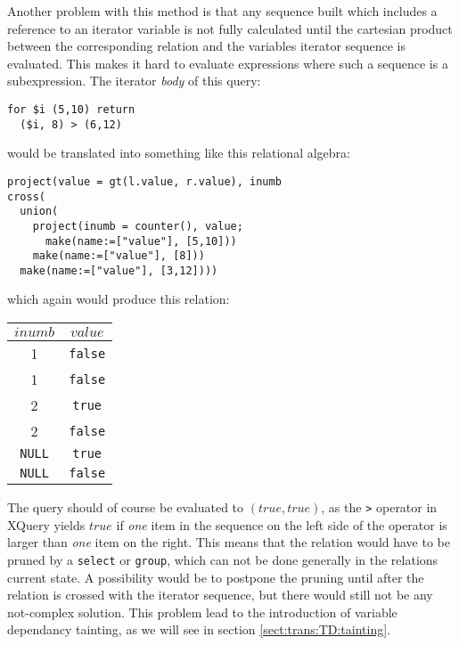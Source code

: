 Another problem with this method is that any sequence built which includes a reference to an iterator variable is
not fully calculated until the cartesian product between the corresponding relation and the variables iterator
sequence is evaluated. This makes it hard to evaluate expressions where such a sequence is a subexpression. The
iterator \textit{body} of this query:

\begin{Verbatim}
for $i (5,10) return
  ($i, 8) > (6,12)
\end{Verbatim}
would be translated into something like this relational algebra:
\begin{Verbatim}
project(value = gt(l.value, r.value), inumb
cross(
  union(
    project(inumb = counter(), value;
      make(name:=["value"], [5,10]))
    make(name:=["value"], [8]))
  make(name:=["value"], [3,12])))
\end{Verbatim}
which again would produce this relation:

\begin{figure*}[!h]
\centering
\begin{tabular}{|c|c|} \hline
$inumb$ & $value$ \\\hline
1 & \texttt{false} \\\hline
1 & \texttt{false} \\\hline
2 & \texttt{true} \\\hline
2 & \texttt{false} \\\hline
\texttt{NULL} & \texttt{true} \\\hline
\texttt{NULL} & \texttt{false} \\\hline
\end{tabular}
\end{figure*}

The query should of course be evaluated to $(true, true)$, as the \texttt{>} operator in XQuery yields $true$ if
\textit{one} item in the sequence on the left side of the operator is larger than \textit{one} item on the right.
This means that the relation would have to be pruned by a \texttt{select} or \texttt{group}, which can not be done
generally in the relations current state. A possibility would be to postpone the pruning until after the relation
is crossed with the iterator sequence, but there would still not be any not-complex solution. This problem lead to
the introduction of variable dependancy tainting, as we will see in section \ref{sect:trans:TD:tainting}.
